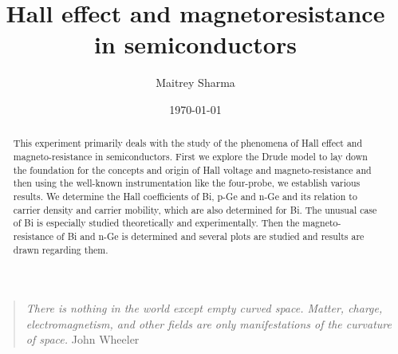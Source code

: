 \documentclass[%
 aip,
 amsmath,amssymb,
 reprint,%
]{revtex4-1}
\begin{document}

\title[Hall effect and magnetoresistance in semiconductors]{Hall effect and magnetoresistance in semiconductors}
\author{Maitrey Sharma}

\date{\today}%

\begin{abstract}
This experiment primarily deals with the study of the phenomena of Hall effect and magneto-resistance in semiconductors. First we explore the Drude model to lay down the foundation for the concepts and origin of Hall voltage and magneto-resistance and then using the well-known instrumentation like the four-probe, we establish various results. We determine the Hall coefficients of Bi, p-Ge and n-Ge and its relation to carrier density and carrier mobility, which are also determined for Bi. The unusual case of Bi is especially studied theoretically and experimentally. Then the magneto-resistance of Bi and n-Ge is determined and several plots are studied and results are drawn regarding them. 
\end{abstract}

\maketitle 


\begin{quotation}
\textit{There is nothing in the world except empty curved space. Matter, charge, electromagnetism, and other fields are only manifestations of the curvature of space.}
\newline
\hspace*{0pt}\hfill John Wheeler
\end{quotation}
\end{document}
